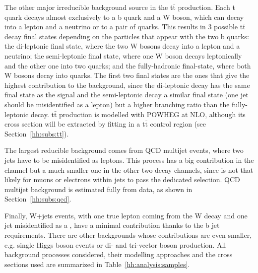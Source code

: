 \documentclass[../main.tex]{subfiles}
\begin{document}
The other major irreducible background source in the t$\bar{\text{t}}$ production. Each t quark decays almost exclusively to a b quark and a W boson, which can decay into a lepton and a neutrino or to a pair of quarks. This results in 3 possible t$\bar{\text{t}}$ decay final states depending on the particles that appear with the two b quarks: the di-leptonic final state, where the two W bosons decay into a lepton and a neutrino; the semi-leptonic final state, where one W boson decays leptonically and the other one into two quarks; and the fully-hadronic final-state, where both W bosons decay into quarks. The first two final states are the ones that give the highest contribution to the background, since the di-leptonic decay has the same final state as the signal and the semi-leptonic decay a similar final state (one jet should be misidentified as a lepton) but a higher branching ratio than the fully-leptonic decay. t$\bar{\text{t}}$ production is modelled with \textsc{POWHEG} at NLO, although its cross section will be extracted by fitting in a t$\bar{\text{t}}$ control region (see Section~\ref{hh:subs:tt}).

The largest reducible background comes from QCD multijet events, where two jets have to be misidentified as leptons. This process has a big contribution in the \tauh\tauh{} channel but a much smaller one in the other two decay channels, since is not that likely for muons or electrons within jets to pass the dedicated selection. QCD multijet background is estimated fully from data, as shown in Section~\ref{hh:subs:qcd}.

Finally, W+jets events, with one true lepton coming from the W decay and one jet misidentified as a \tauh{}, have a minimal contribution thanks to the b jet requirements. There are other backgrounds whose contributions are even smaller, e.g. single Higgs boson events or di- and tri-vector boson production. All background processes considered, their modelling approaches and the cross sections used are summarized in Table~\ref{hh:analysis:samples}.
\end{document}
